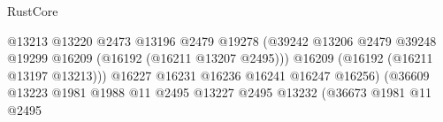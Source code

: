 \begin{lexlean}{RustCore}
\begin{coremodule}
                                                                    @13213
                                                                    @13220
                                                                    @2473
                                                                    @13196
                                                                    @2479
                                                                    @19278
                                                                    (@39242
                                                                      @13206
                                                                      @2479
                                                                      @39248
                                                                      @19299
                                                                      @16209
                                                                      (@16192
                                                                        (@16211 @13207 @2495)))
                                                                    @16209
                                                                    (@16192 (@16211 @13197 @13213)))
                                                                  @16227
                                                                  @16231
                                                                  @16236
                                                                  @16241
                                                                  @16247
                                                                  @16256)
                                                                (@36609
                                                                  @13223
                                                                  @1981
                                                                  @1988
                                                                  @11
                                                                  @2495
                                                                  @13227
                                                                  @2495
                                                                  @13232
                                                                  (@36673
                                                                    @1981
                                                                    @11
                                                                    @2495

\end{coremodule}
\end{lexlean}
